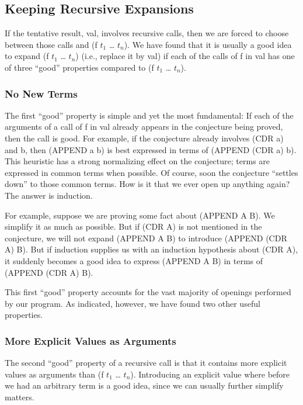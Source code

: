 \documentclass[10pt]{book}
\begin{document}
\subsection{Keeping Recursive Expansions}
If the tentative result, val,  involves recursive calls, then we are 
forced to choose between those calls and (f $t_{1}$ \ldots{} $t_{n}$).
We have found that it is usually a good idea to expand (f $t_{1}$ \ldots{} $t_{n}$)
(i.e., replace it by val) if each of the calls of f in val has one of
three ``good'' properties compared to (f $t_{1}$ \ldots{} $t_{n}$).

\subsubsection{No New Terms}
The first ``good'' property is simple and yet the most fundamental:
If each of the arguments of a call of f in val already appears
in the conjecture being proved, then the call is good.
For example, if the conjecture already involves
(CDR a) and b, then (APPEND a b) is best expressed in terms of (APPEND (CDR a) b).
This heuristic has a strong normalizing effect on the conjecture;
terms are expressed in common terms when possible.  Of course,
soon the conjecture ``settles down'' to those common terms.
How  is it that we ever open up anything again?  The answer is induction.

For example, suppose we are proving some fact about (APPEND A B).
We  simplify it as much as possible.  But if (CDR A) is not 
mentioned in  the conjecture, we will not
expand (APPEND A B) to introduce (APPEND (CDR A) B).  But if induction
supplies us with an induction hypothesis about (CDR A), it suddenly
becomes a good idea to express (APPEND A B) in terms of (APPEND (CDR A) B).

This first ``good'' property accounts for
the vast majority of openings performed by our program.  As indicated, however, we have
found two other useful properties.

\subsubsection{More Explicit Values as Arguments}
The second ``good'' property of a recursive call is that it contains
more explicit values as arguments than (f $t_{1}$ \ldots{} $t_{n}$).  Introducing
an explicit value where before we had an arbitrary term is a good idea,
since we can usually further simplify matters.
\end{document}
